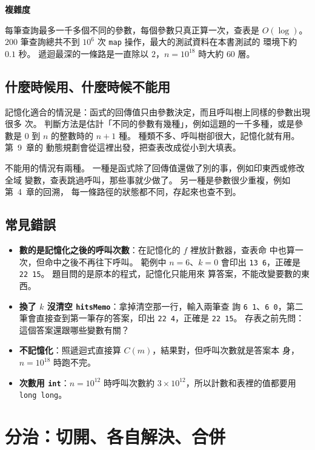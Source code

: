 \textbf{複雜度}

每筆查詢最多一千多個不同的參數，每個參數只真正算一次，查表是 $O(\log)$。
$200$ 筆查詢總共不到 $10^6$ 次 \texttt{map} 操作，最大的測試資料在本書測試的
環境下約 $0.1$ 秒。 遞迴最深的一條路是一直除以 $2$，$n = 10^{18}$ 時大約
$60$ 層。

\subsection{什麼時候用、什麼時候不能用}

記憶化適合的情況是：函式的回傳值只由參數決定，而且呼叫樹上同樣的參數出現很多
次。 判斷方法是估計「不同的參數有幾種」，例如這題的一千多種，或是參數是 $0$ 到
$n$ 的整數時的 $n + 1$ 種。 種類不多、呼叫樹卻很大，記憶化就有用。 第~9~章的
動態規劃會從這裡出發，把查表改成從小到大填表。

不能用的情況有兩種。 一種是函式除了回傳值還做了別的事，例如印東西或修改全域
變數，查表跳過呼叫，那些事就少做了。 另一種是參數很少重複，例如第~4~章的回溯，
每一條路徑的狀態都不同，存起來也查不到。

\subsection{常見錯誤}

\begin{itemize}
\item \textbf{數的是記憶化之後的呼叫次數}：在記憶化的 $f$ 裡放計數器，查表命
中也算一次，但命中之後不再往下呼叫。 範例中 $n = 6$、$k = 0$ 會印出
\texttt{13 6}，正確是 \texttt{22 15}。 題目問的是原本的程式，記憶化只能用來
算答案，不能改變要數的東西。
\item \textbf{換了 $k$ 沒清空 \texttt{hitsMemo}}：拿掉清空那一行，輸入兩筆查
詢 \texttt{6 1}、\texttt{6 0}，第二筆會直接查到第一筆存的答案，印出
\texttt{22 4}，正確是 \texttt{22 15}。 存表之前先問：這個答案還跟哪些變數有關？
\item \textbf{不記憶化}：照遞迴式直接算 $C(m)$，結果對，但呼叫次數就是答案本
身，$n = 10^{18}$ 時跑不完。
\item \textbf{次數用 \texttt{int}}：$n = 10^{12}$ 時呼叫次數約 $3 \times
10^{12}$，所以計數和表裡的值都要用 \texttt{long long}。
\end{itemize}

\section{分治：切開、各自解決、合併}
\label{sec:rec-dc}

